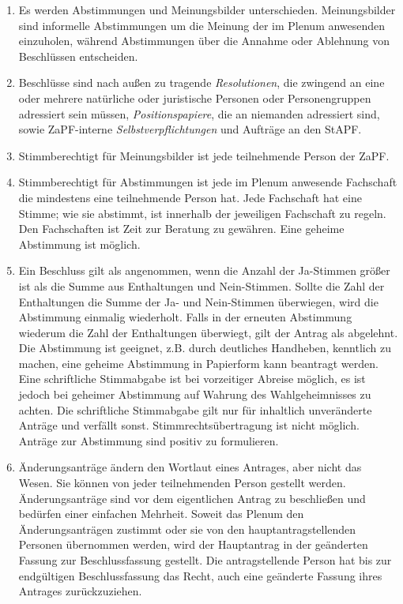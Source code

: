 \documentclass[12pt,oneside]{scrartcl}
\begin{document}
\begin{enumerate}
\item Es werden Abstimmungen und Meinungsbilder unterschieden. Meinungsbilder
sind informelle Abstimmungen um die Meinung der im Plenum anwesenden
einzuholen, während Abstimmungen über die Annahme oder Ablehnung von
Beschlüssen entscheiden.

\item Beschlüsse sind nach außen zu tragende \emph{Resolutionen}, die zwingend an eine
oder mehrere natürliche oder juristische Personen oder Personengruppen
adressiert sein müssen, \emph{Positionspapiere}, die an niemanden adressiert sind,
sowie ZaPF-interne \emph{Selbstverpflichtungen} und Aufträge an den StAPF.

\item Stimmberechtigt für Meinungsbilder ist jede teilnehmende Person der ZaPF.

\item Stimmberechtigt für Abstimmungen ist jede im Plenum anwesende Fachschaft
die mindestens eine teilnehmende Person hat.
Jede Fachschaft hat eine Stimme; wie sie abstimmt, ist innerhalb der
jeweiligen Fachschaft zu regeln.
Den Fachschaften ist Zeit zur Beratung zu gewähren.
Eine geheime Abstimmung ist möglich.

\item Ein Beschluss gilt als angenommen, wenn die Anzahl der Ja-Stimmen größer
ist als die Summe aus Enthaltungen und Nein-Stimmen.
Sollte die Zahl der Enthaltungen die Summe der Ja- und Nein-Stimmen
überwiegen, wird die Abstimmung einmalig wiederholt.
Falls in der erneuten Abstimmung wiederum die Zahl der Enthaltungen
überwiegt, gilt der Antrag als abgelehnt.
Die Abstimmung ist geeignet, z.B. durch deutliches Handheben, kenntlich zu
machen, eine geheime Abstimmung in Papierform kann beantragt werden.
Eine schriftliche Stimmabgabe ist bei vorzeitiger Abreise möglich, es ist
jedoch bei geheimer Abstimmung auf Wahrung des Wahlgeheimnisses zu achten.
Die schriftliche Stimmabgabe gilt nur für inhaltlich unveränderte Anträge
und verfällt sonst.
Stimmrechtsübertragung ist nicht möglich.
Anträge zur Abstimmung sind positiv zu formulieren.

\item Änderungsanträge ändern den Wortlaut eines Antrages, aber nicht das Wesen.
Sie können von jeder teilnehmenden Person gestellt werden.
Änderungsanträge sind vor dem eigentlichen Antrag zu beschließen und
bedürfen einer einfachen Mehrheit.
Soweit das Plenum den Änderungsanträgen zustimmt oder sie von den
hauptantragstellenden Personen übernommen werden,
wird der Hauptantrag in der geänderten Fassung zur Beschlussfassung gestellt.
Die antragstellende Person hat bis zur endgültigen Beschlussfassung das Recht,
auch eine geänderte Fassung ihres Antrages zurückzuziehen.


\end{enumerate}
\end{document}
